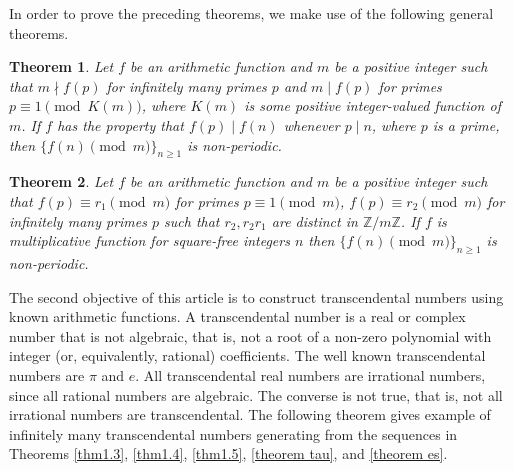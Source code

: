 \documentclass[12pt,reqno]{amsart}
\newtheorem{theorem}{Theorem}[section]
\begin{document}
In order to prove the preceding theorems, we make use of the following general theorems.
\begin{theorem}\label{thm1.8}
 Let $f$ be an arithmetic function and $m$ be a positive integer such that $m\nmid f(p)$ for infinitely many primes $p$ and $m\mid f(p)$ for primes $p\equiv 1 \pmod{K(m)}$, where $K(m)$ is some positive integer-valued function of $m$. If $f$  has the property that $f(p)\mid f(n)$ whenever $p\mid n$, where $p$ is a prime, then $\{f(n) \pmod{m}\}_{n\geq1}$ is non-periodic.   
\end{theorem}
\begin{theorem}\label{thm1.9}
Let $f$ be an arithmetic function and $m$ be a positive integer such that $f(p)\equiv r_1\pmod{m}$ for primes $p\equiv1\pmod{m}$, $f(p)\equiv r_2\pmod{m}$ for infinitely many primes $p$ such that $r_2,r_2r_1$ are distinct in $\mathbb{Z}/m\mathbb{Z}$. If $f$ is multiplicative function for square-free integers $n$ then $\{f(n) \pmod{m}\}_{n\geq1}$ is non-periodic.  
\end{theorem}
The second objective of this article is to construct transcendental numbers using known arithmetic functions. A transcendental number is a real or complex number that is not algebraic, that is, not a root of a non-zero polynomial with integer (or, equivalently, rational) coefficients. The well known transcendental numbers are $\pi$ and $e$. All transcendental real numbers are irrational numbers, since all rational numbers are algebraic. The converse is not true, that is, not all irrational numbers are transcendental. The following theorem gives example of infinitely many transcendental numbers generating from the sequences in Theorems \ref{thm1.3}, \ref{thm1.4}, \ref{thm1.5}, \ref{theorem tau}, and \ref{theorem es}.
\end{document}
